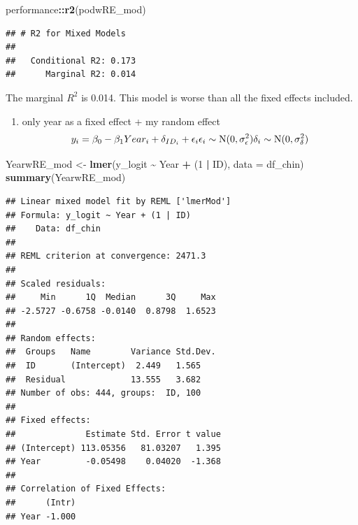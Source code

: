 \documentclass[
]{article}
\newenvironment{Shaded}{\begin{snugshade}}{\end{snugshade}}
\newcommand{\AttributeTok}[1]{\textcolor[rgb]{0.13,0.29,0.53}{#1}}
\newcommand{\DecValTok}[1]{\textcolor[rgb]{0.00,0.00,0.81}{#1}}
\newcommand{\FunctionTok}[1]{\textcolor[rgb]{0.13,0.29,0.53}{\textbf{#1}}}
\newcommand{\NormalTok}[1]{#1}
\newcommand{\OtherTok}[1]{\textcolor[rgb]{0.56,0.35,0.01}{#1}}
\newcommand{\SpecialCharTok}[1]{\textcolor[rgb]{0.81,0.36,0.00}{\textbf{#1}}}
\providecommand{\tightlist}{%
  \setlength{\itemsep}{0pt}\setlength{\parskip}{0pt}}
\begin{document}
\begin{Shaded}
\begin{Highlighting}[]
\NormalTok{performance}\SpecialCharTok{::}\FunctionTok{r2}\NormalTok{(podwRE\_mod)}
\end{Highlighting}
\end{Shaded}

\begin{verbatim}
## # R2 for Mixed Models
## 
##   Conditional R2: 0.173
##      Marginal R2: 0.014
\end{verbatim}

The marginal \(R^2\) is 0.014. This model is worse than all the fixed
effects included.

\begin{enumerate}
\def\labelenumi{\arabic{enumi}.}
\setcounter{enumi}{2}
\tightlist
\item
  only year as a fixed effect + my random effect \[
  y_i = \beta_0 - \beta_1 Year_i + \delta_{ID_i}+ \epsilon_i \\
  \epsilon_i \sim \text{N}(0, \sigma_\epsilon^2) \\
  \delta_{i} \sim \text{N}(0, \sigma_\delta^2) \\
  \]
\end{enumerate}

\begin{Shaded}
\begin{Highlighting}[]
\NormalTok{YearwRE\_mod }\OtherTok{\textless{}{-}} \FunctionTok{lmer}\NormalTok{(y\_logit }\SpecialCharTok{\textasciitilde{}}\NormalTok{ Year }\SpecialCharTok{+}\NormalTok{ (}\DecValTok{1} \SpecialCharTok{|}\NormalTok{ ID), }\AttributeTok{data =}\NormalTok{ df\_chin)}
\FunctionTok{summary}\NormalTok{(YearwRE\_mod)}
\end{Highlighting}
\end{Shaded}

\begin{verbatim}
## Linear mixed model fit by REML ['lmerMod']
## Formula: y_logit ~ Year + (1 | ID)
##    Data: df_chin
## 
## REML criterion at convergence: 2471.3
## 
## Scaled residuals: 
##     Min      1Q  Median      3Q     Max 
## -2.5727 -0.6758 -0.0140  0.8798  1.6523 
## 
## Random effects:
##  Groups   Name        Variance Std.Dev.
##  ID       (Intercept)  2.449   1.565   
##  Residual             13.555   3.682   
## Number of obs: 444, groups:  ID, 100
## 
## Fixed effects:
##              Estimate Std. Error t value
## (Intercept) 113.05356   81.03207   1.395
## Year         -0.05498    0.04020  -1.368
## 
## Correlation of Fixed Effects:
##      (Intr)
## Year -1.000
\end{verbatim}
\end{document}
